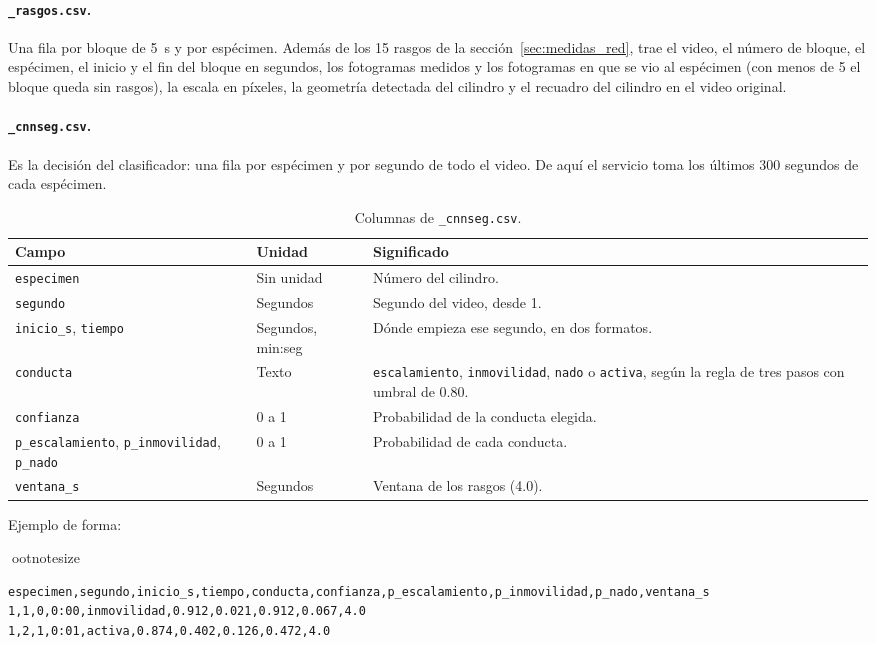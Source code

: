 \paragraph{\texttt{\_rasgos.csv}.} Una fila por bloque de 5~s y por espécimen. Además
de los 15 rasgos de la sección~\ref{sec:medidas_red}, trae el video, el número de
bloque, el espécimen, el inicio y el fin del bloque en segundos, los fotogramas
medidos y los fotogramas en que se vio al espécimen (con menos de 5 el bloque queda
sin rasgos), la escala en píxeles, la geometría detectada del cilindro y el recuadro
del cilindro en el video original.

\paragraph{\texttt{\_cnnseg.csv}.} Es la decisión del clasificador: una fila por
espécimen y por segundo de todo el video. De aquí el servicio toma los últimos 300
segundos de cada espécimen.

\begin{table}[H]
\centering
\caption{Columnas de \texttt{\_cnnseg.csv}.}
\label{tab:ap_cnnseg}
\begin{tabular}{|p{3.4cm}|p{2.2cm}|p{8.2cm}|}
\hline
\textbf{Campo} & \textbf{Unidad} & \textbf{Significado} \\
\hline
\texttt{especimen} & Sin unidad & Número del cilindro. \\
\hline
\texttt{segundo} & Segundos & Segundo del video, desde 1. \\
\hline
\texttt{inicio\_s}, \texttt{tiempo} & Segundos, min:seg & Dónde empieza ese segundo,
en dos formatos. \\
\hline
\texttt{conducta} & Texto & \texttt{escalamiento}, \texttt{inmovilidad},
\texttt{nado} o \texttt{activa}, según la regla de tres pasos con umbral de 0.80. \\
\hline
\texttt{confianza} & 0 a 1 & Probabilidad de la conducta elegida. \\
\hline
\texttt{p\_escalamiento}, \texttt{p\_inmovilidad}, \texttt{p\_nado} & 0 a 1 &
Probabilidad de cada conducta. \\
\hline
\texttt{ventana\_s} & Segundos & Ventana de los rasgos (4.0). \\
\hline
\end{tabular}
\end{table}

Ejemplo de forma:

{ootnotesize
\begin{verbatim}
especimen,segundo,inicio_s,tiempo,conducta,confianza,p_escalamiento,p_inmovilidad,p_nado,ventana_s
1,1,0,0:00,inmovilidad,0.912,0.021,0.912,0.067,4.0
1,2,1,0:01,activa,0.874,0.402,0.126,0.472,4.0
\end{verbatim}}

